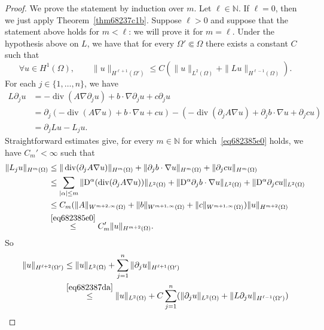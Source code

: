 \documentclass[a4paper,9pt]{amsart}
\newcommand{\N}{\mathbb{N}}	%
\newcommand{\de}{\partial}		%
\newcommand{\Diff}{\mathrm{D}}
\renewcommand{\div}{\operatorname{div}}	%
\newcommand{\grad}{\nabla}
\theoremstyle{plain}
\theoremstyle{definition}
\theoremstyle{remark}
\begin{document}
\begin{proof}
	We prove the statement by induction over $m$.
	Let $\ell\in\N$. If $\ell=0$, then we just apply Theorem~\ref{thm68237c1b}.
	Suppose $\ell>0$ and suppose that the statement above holds for $m<\ell$:
	we will prove it for $m=\ell$.
	Under the hypothesis above on $L$, we have that for every $\Omega'\Subset\Omega$ there exists a constant $C$ such that
	\begin{equation}\label{eq682387da}
		\forall u\in H^1(\Omega),\qquad
		\|u\|_{H^{\ell+1}(\Omega')} \le C (\|u\|_{L^2(\Omega)} + \|Lu\|_{H^{\ell-1}(\Omega)} ) .
	\end{equation}
	For each $j\in\{1,\dots,n\}$, we have
	\begin{equation}\label{eq68239171}
	\begin{aligned}
		L\de_ju
		&= -\div(A\grad\de_ju) + b\cdot\grad \de_ju + c \de_ju\\
		&= \de_j(-\div(A\grad u) + b\cdot\grad u + cu)
			- \left( -\div(\de_jA\grad u) + \de_jb\cdot\grad u + \de_jcu \right) \\
		&= \de_j Lu - L_ju .
	\end{aligned}
	\end{equation}
	Straightforward estimates give, for every $m\in\N$ for which~\eqref{eq682385e0} holds, we have $C_m'<\infty$ such that
	\begin{equation}\label{eq6823968e}
	\begin{aligned}
		\|L_ju\|_{H^m(\Omega)}
		&\le \|\div(\de_jA\grad u)\|_{H^m(\Omega)} + \|\de_jb\cdot\grad u\|_{H^m(\Omega)} + \|\de_jcu\|_{H^m(\Omega)} \\
		&\le \sum_{|\alpha|\le m} \|\Diff^\alpha(\div(\de_jA\grad u))\|_{L^2(\Omega)} 
			+ \|\Diff^\alpha\de_jb\cdot\grad u\|_{L^2(\Omega)} 
			+ \|\Diff^\alpha\de_jcu\|_{L^2(\Omega)} \\
		&\le C_m ( \|A\|_{W^{m+2,\infty}(\Omega)} 
			+ \|b\|_{W^{m+1,\infty}(\Omega)}
			+ \|c\|_{W^{m+1,\infty}(\Omega)})
			\|u\|_{H^{m+2}(\Omega)} \\
		&\overset{\eqref{eq682385e0}}\le C_m' \|u\|_{H^{m+2}(\Omega)} .
	\end{aligned}
	\end{equation}
	So
	\begin{align}
		\|u\|_{H^{\ell+2}(\Omega')}
		&\le \|u\|_{L^2(\Omega)} + \sum_{j=1}^n \|\de_ju\|_{H^{\ell+1}(\Omega')} \\
		&\overset{\eqref{eq682387da}}\le \|u\|_{L^2(\Omega)} 
			+ C \sum_{j=1}^n (\|\de_ju\|_{L^2(\Omega)} + \|L\de_ju\|_{H^{\ell-1}(\Omega')} ) \\

\end{align}
\end{proof}
\end{document}
